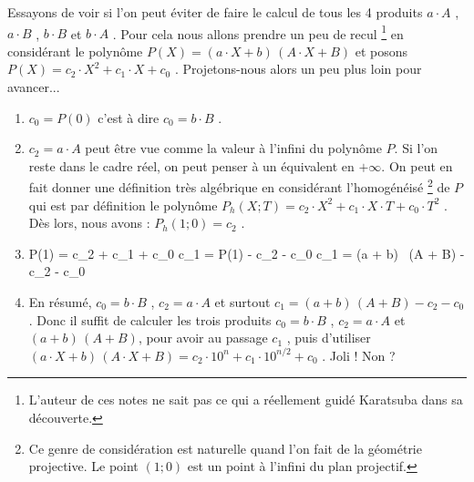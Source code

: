 \bigskip


Essayons de voir si l'on peut éviter de faire le calcul de tous les 4 produits $a \cdot A$ ,  $a \cdot B$ , $b \cdot B$ et $b \cdot A$ . 
Pour cela nous allons prendre un peu de recul
\footnote{
	L'auteur de ces notes ne sait pas ce qui a réellement guidé Karatsuba dans sa découverte.
}
en considérant le polynôme $P(X) = (a \cdot X + b) \, (A \cdot X + B)$ et posons $P(X) = c_2 \cdot X^2 + c_1 \cdot X + c_0$ . Projetons-nous alors un peu plus loin pour avancer...

\begin{enumerate}
	\item $c_0 = P(0)$ c'est à dire $c_0 = b \cdot B$ .

	
	\item $c_2 = a \cdot A$ peut être vue comme la valeur à l'infini du polynôme $P$. Si l'on reste dans le cadre réel, on peut penser à un équivalent en $+\infty$. On peut en fait donner une définition très algébrique en considérant l'homogénéisé
	\footnote{
		Ce genre de considération est naturelle quand l'on fait de la géométrie projective.
		Le point $(1 ; 0)$ est un point à l'infini du plan projectif.
	}
	de $P$ qui est par définition le polynôme $P_h(X ; T) = c_2 \cdot X^2 + c_1 \cdot X \cdot T + c_0 \cdot T^2$ .
	Dès lors, nous avons : $P_h(1 ; 0) = c_2$ .

	
	\item
	\begin{explain}[style = sar, ope = \iff]
		P(1) = c_2 + c_1 + c_0
			\explnext{}
		c_1 = P(1) - c_2 - c_0
			\explnext{}
		c_1 = (a + b) \, (A + B) - c_2 - c_0
	\end{explain}
	
	
	\item En résumé, 
	$c_0 = b \cdot B$ ,
	$c_2 = a \cdot A$
	et surtout 
	$c_1 = (a + b) \, (A + B) - c_2 - c_0$ .
	Donc il suffit de calculer les trois produits
	$c_0 = b \cdot B$ ,
	$c_2 = a \cdot A$
	et 
	$(a + b) \, (A + B)$,
	pour avoir au passage $c_1$ ,
	puis d'utiliser
	$(a \cdot X + b) \, (A \cdot X + B) %
	 = %
	 c_2 \cdot 10^n + c_1 \cdot 10^{n/2} + c_0$ .
	Joli ! Non ?
\end{enumerate}